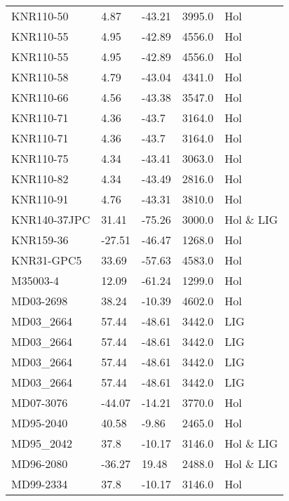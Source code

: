 \begin{longtable}{lllrl}
        KNR110-50 &     4.87 &    -43.21 &     3995.0 &         Hol \\
        KNR110-55 &     4.95 &    -42.89 &     4556.0 &         Hol \\
        KNR110-55 &     4.95 &    -42.89 &     4556.0 &         Hol \\
        KNR110-58 &     4.79 &    -43.04 &     4341.0 &         Hol \\
        KNR110-66 &     4.56 &    -43.38 &     3547.0 &         Hol \\
        KNR110-71 &     4.36 &     -43.7 &     3164.0 &         Hol \\
        KNR110-71 &     4.36 &     -43.7 &     3164.0 &         Hol \\
        KNR110-75 &     4.34 &    -43.41 &     3063.0 &         Hol \\
        KNR110-82 &     4.34 &    -43.49 &     2816.0 &         Hol \\
        KNR110-91 &     4.76 &    -43.31 &     3810.0 &         Hol \\
     KNR140-37JPC &    31.41 &    -75.26 &     3000.0 &   Hol \& LIG \\
        KNR159-36 &   -27.51 &    -46.47 &     1268.0 &         Hol \\
       KNR31-GPC5 &    33.69 &    -57.63 &     4583.0 &         Hol \\
         M35003-4 &    12.09 &    -61.24 &     1299.0 &         Hol \\
        MD03-2698 &    38.24 &    -10.39 &     4602.0 &         Hol \\
        MD03\_2664 &    57.44 &    -48.61 &     3442.0 &         LIG \\
        MD03\_2664 &    57.44 &    -48.61 &     3442.0 &         LIG \\
        MD03\_2664 &    57.44 &    -48.61 &     3442.0 &         LIG \\
        MD03\_2664 &    57.44 &    -48.61 &     3442.0 &         LIG \\
        MD07-3076 &   -44.07 &    -14.21 &     3770.0 &         Hol \\
        MD95-2040 &    40.58 &     -9.86 &     2465.0 &         Hol \\
        MD95\_2042 &     37.8 &    -10.17 &     3146.0 &   Hol \& LIG \\
        MD96-2080 &   -36.27 &     19.48 &     2488.0 &   Hol \& LIG \\
        MD99-2334 &     37.8 &    -10.17 &     3146.0 &         Hol \\

\end{longtable}
